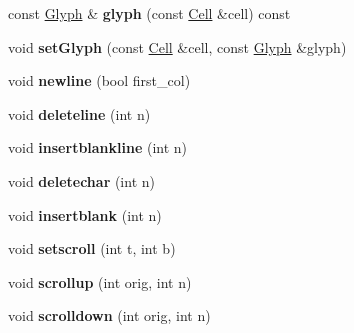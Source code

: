 \begin{DoxyCompactItemize}
\item 
\mbox{\label{classscreen_1_1Screen_a149441fd5aad3b293596e6b4e27627eb}} 
const \mbox{\hyperlink{structscreen_1_1Glyph}{Glyph}} \& {\bfseries glyph} (const \mbox{\hyperlink{structCell}{Cell}} \&cell) const
\item 
\mbox{\label{classscreen_1_1Screen_aaee80923cd625a2a006b954c0757d459}} 
void {\bfseries set\+Glyph} (const \mbox{\hyperlink{structCell}{Cell}} \&cell, const \mbox{\hyperlink{structscreen_1_1Glyph}{Glyph}} \&glyph)
\item 
\mbox{\label{classscreen_1_1Screen_a6470cb295bd5dc4d4432ff98d1627678}} 
void {\bfseries newline} (bool first\+\_\+col)
\item 
\mbox{\label{classscreen_1_1Screen_a1b30edaf55004b20f0a22afee4d8fa35}} 
void {\bfseries deleteline} (int n)
\item 
\mbox{\label{classscreen_1_1Screen_acbdcff21aadf9b5df42a3f15eab33b49}} 
void {\bfseries insertblankline} (int n)
\item 
\mbox{\label{classscreen_1_1Screen_a908e2ac52d5f92cf71fa4951c69fcfff}} 
void {\bfseries deletechar} (int n)
\item 
\mbox{\label{classscreen_1_1Screen_a20b102213a5b853aef37ea360678988b}} 
void {\bfseries insertblank} (int n)
\item 
\mbox{\label{classscreen_1_1Screen_ab621cb6442f5f3f08973981b0aea677b}} 
void {\bfseries setscroll} (int t, int b)
\item 
\mbox{\label{classscreen_1_1Screen_aa2a332fc2ce2fc47bdb9e0ba425065c7}} 
void {\bfseries scrollup} (int orig, int n)
\item 
\mbox{\label{classscreen_1_1Screen_ad2af92f7672dc773c39536b207eb9bdd}} 
void {\bfseries scrolldown} (int orig, int n)
\item 
\mbox{\label{classscreen_1_1Screen_a6758014dc93c590521841297bb649365}} 

\end{DoxyCompactItemize}

